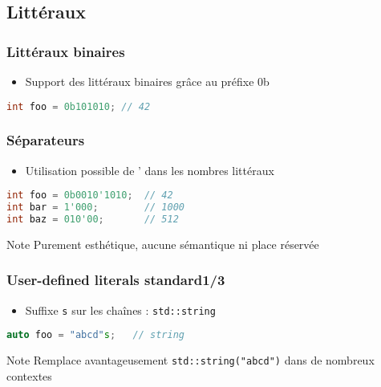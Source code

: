 \documentclass[C++.tex]{subfiles}
\begin{document}
\subsection*{Littéraux}
\begin{frame}[fragile]
	\frametitle{Littéraux binaires}
	\begin{itemize}
		\item Support des littéraux binaires grâce au préfixe \og 0b\fg{}
	\end{itemize}

	\begin{lstlisting}[language=C++]
int foo = 0b101010; // 42\end{lstlisting}
\end{frame}

\begin{frame}[fragile]
	\frametitle{Séparateurs}
	\begin{itemize}
		\item Utilisation possible de ' dans les nombres littéraux
	\end{itemize}

	\begin{lstlisting}[language=C++]
int foo = 0b0010'1010;  // 42
int bar = 1'000;        // 1000
int baz = 010'00;       // 512\end{lstlisting}

	\begin{block}{Note}
		Purement esthétique, aucune sémantique ni place réservée
	\end{block}
\end{frame}

\begin{frame}[fragile]
	\frametitle{User-defined literals standard\titlehfill{}1/3}


	\begin{itemize}
		\item Suffixe \lstinline|s| sur les chaînes : \lstinline|std::string|
	\end{itemize}

	\begin{lstlisting}[language=C++]
auto foo = "abcd"s;   // string\end{lstlisting}

	\begin{block}{Note}
		Remplace avantageusement \lstinline|std::string("abcd")| dans de nombreux contextes
	\end{block}
\end{frame}
\end{document}
